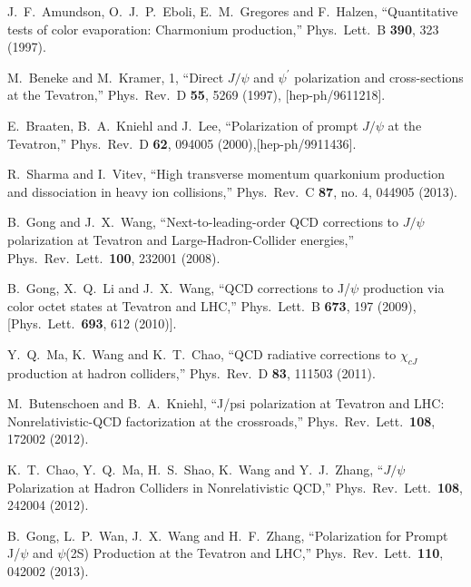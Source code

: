 \documentclass[aps,prc,preprint,superscriptaddress,showpacs,showkeys,amsmath]{revtex4-1}
\begin{document}
\begin{thebibliography}{100}
  J.~F.~Amundson, O.~J.~P.~Eboli, E.~M.~Gregores and F.~Halzen,
  ``Quantitative tests of color evaporation: Charmonium production,''
  Phys.\ Lett.\ B {\bf 390}, 323 (1997).


  M.~Beneke and M.~Kramer, 1,
  ``Direct $J/\psi$ and $\psi^\prime$ polarization and cross-sections at the Tevatron,''
  Phys.\ Rev.\ D {\bf 55}, 5269 (1997), [hep-ph/9611218].


  E.~Braaten, B.~A.~Kniehl and J.~Lee,
  ``Polarization of prompt $J/\psi$ at the Tevatron,''
  Phys.\ Rev.\ D {\bf 62}, 094005 (2000),[hep-ph/9911436].


  R.~Sharma and I.~Vitev,
  ``High transverse momentum quarkonium production and dissociation in heavy ion collisions,''
  Phys.\ Rev.\ C {\bf 87}, no. 4, 044905 (2013).


  B.~Gong and J.~X.~Wang,
  ``Next-to-leading-order QCD corrections to $J/\psi$ polarization at Tevatron and Large-Hadron-Collider energies,''
  Phys.\ Rev.\ Lett.\  {\bf 100}, 232001 (2008).
  

  B.~Gong, X.~Q.~Li and J.~X.~Wang,
  ``QCD corrections to J/$\psi$ production via color octet states at Tevatron and LHC,''
  Phys.\ Lett.\ B {\bf 673}, 197 (2009),
  [Phys.\ Lett.\  {\bf 693}, 612 (2010)].
  
  Y.~Q.~Ma, K.~Wang and K.~T.~Chao,
  ``QCD radiative corrections to $\chi_{cJ}$ production at hadron colliders,''
  Phys.\ Rev.\ D {\bf 83}, 111503 (2011).


  M.~Butenschoen and B.~A.~Kniehl,
  ``J/psi polarization at Tevatron and LHC: Nonrelativistic-QCD factorization at the crossroads,''
  Phys.\ Rev.\ Lett.\  {\bf 108}, 172002 (2012).
  
  K.~T.~Chao, Y.~Q.~Ma, H.~S.~Shao, K.~Wang and Y.~J.~Zhang,
  ``$J/\psi$ Polarization at Hadron Colliders in Nonrelativistic QCD,''
  Phys.\ Rev.\ Lett.\  {\bf 108}, 242004 (2012).
  
  B.~Gong, L.~P.~Wan, J.~X.~Wang and H.~F.~Zhang,
  ``Polarization for Prompt J/$\psi$ and $\psi$(2S) Production at the Tevatron and LHC,''
  Phys.\ Rev.\ Lett.\  {\bf 110}, 042002 (2013).
 

\end{thebibliography}
\end{document}
